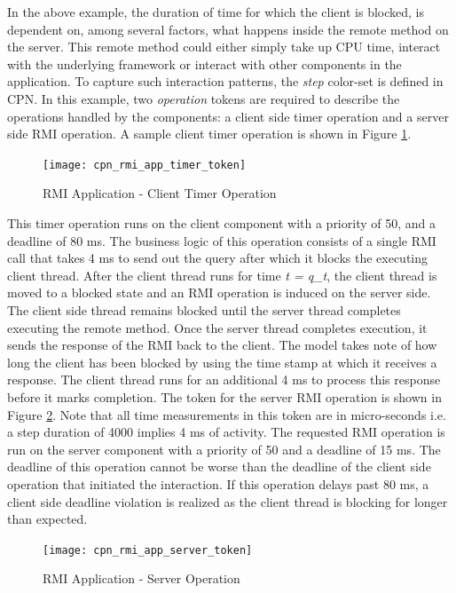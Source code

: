 In the above example, the duration of time for which the client is blocked, is dependent on, among several factors, what happens inside the remote method on the server. This remote method could either simply take up CPU time, interact with the underlying framework or interact with other components in the application. To capture such interaction patterns, the \emph{step} color-set is defined in CPN. In this example, two \emph{operation} tokens are required to describe the operations handled by the components: a client side timer operation and a server side RMI operation. A sample client timer operation is shown in Figure \ref{fig:cpn_rmi_app_timer_token}.

\begin{figure}[ht]
	\centering
	\texttt{[image: cpn\_rmi\_app\_timer\_token]}
	\caption{RMI Application - Client Timer Operation}
	\label{fig:cpn_rmi_app_timer_token}
\end{figure}

This timer operation runs on the client component with a priority of 50, and a deadline of 80 ms. The business logic of this operation consists of a single RMI call that takes 4 ms to send out the query after which it blocks the executing client thread. After the client thread runs for time \emph{t = q\_t}, the client thread is moved to a blocked state and an RMI operation is induced on the server side. The client side thread remains blocked until the server thread completes executing the remote method. Once the server thread completes execution, it sends the response of the RMI back to the client. The model takes note of how long the client has been blocked by using the time stamp at which it receives a response. The client thread runs for an additional 4 ms to process this response before it marks completion. The token for the server RMI operation is shown in Figure \ref{fig:cpn_rmi_app_server_token}. Note that all time measurements in this token are in micro-seconds i.e. a step duration of 4000 implies 4 ms of activity. The requested RMI operation is run on the server component with a priority of 50 and a deadline of 15 ms. The deadline of this operation cannot be worse than the deadline of the client side operation that initiated the interaction. If this operation delays past 80 ms, a client side deadline violation is realized as the client thread is blocking for longer than expected. 

\begin{figure}[ht]
	\centering
	\texttt{[image: cpn\_rmi\_app\_server\_token]}
	\caption{RMI Application - Server Operation}
	\label{fig:cpn_rmi_app_server_token}
\end{figure}


